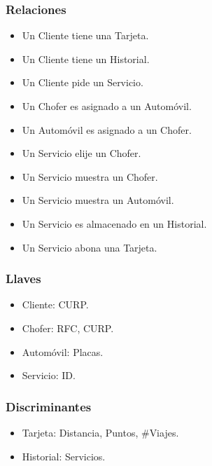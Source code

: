 \documentclass{article}
\begin{document}
       { \noindent
         \subsubsection*{Relaciones}
         \begin{multicols}{2}
           \begin{itemize}
           \item Un Cliente tiene una Tarjeta.
           \item Un Cliente tiene un Historial.
           \item Un Cliente pide un Servicio.
             
           \item Un Chofer es asignado a un Automóvil.
             
           \item Un Automóvil es asignado a un Chofer.
             
           \item Un Servicio elije un Chofer.
           \item Un Servicio muestra un Chofer.
           \item Un Servicio muestra un Automóvil.
           \item Un Servicio es almacenado en un Historial. 
           \item Un Servicio abona una Tarjeta.        
           \end{itemize}
         \end{multicols}
       }
       
       { \noindent
         \subsubsection*{Llaves}
         \begin{multicols}{2}
           \begin{itemize}
           \item Cliente: CURP.
           \item Chofer: RFC, CURP.
           \item Automóvil: Placas.
           \item Servicio: ID.
           \end{itemize}
         \end{multicols}
       }
       
       { \noindent
         \subsubsection*{Discriminantes}
         \begin{multicols}{2}
           \begin{itemize}
           \item Tarjeta: Distancia, Puntos, $\#$Viajes.
           \item Historial: Servicios.
           \end{itemize}
         \end{multicols}
       }
       
\end{document}
